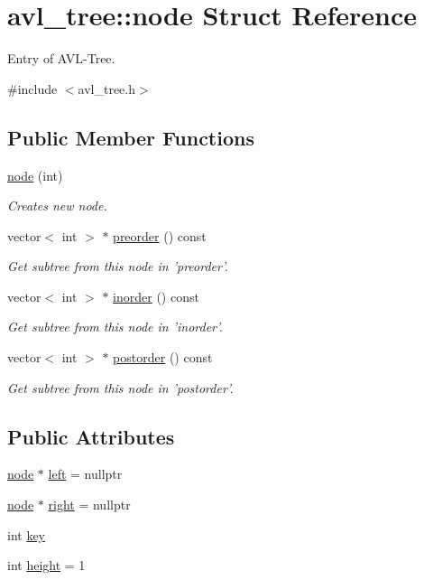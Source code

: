 \hypertarget{structavl__tree_1_1node}{\section{avl\-\_\-tree\-:\-:node Struct Reference}
\label{structavl__tree_1_1node}
}


Entry of A\-V\-L-\/\-Tree.  




{\ttfamily \#include $<$avl\-\_\-tree.\-h$>$}

\subsection*{Public Member Functions}
\begin{DoxyCompactItemize}
\item 
\hyperlink{structavl__tree_1_1node_a94e7fa472a575bbcae1e506c4c8b3534}{node} (int)
\begin{DoxyCompactList}\small\item\em Creates new node. \end{DoxyCompactList}\item 
vector$<$ int $>$ $\ast$ \hyperlink{structavl__tree_1_1node_a6932b4c28a69e1adc86f41f74e16cd6e}{preorder} () const 
\begin{DoxyCompactList}\small\item\em Get subtree from this node in 'preorder'. \end{DoxyCompactList}\item 
vector$<$ int $>$ $\ast$ \hyperlink{structavl__tree_1_1node_ac0a51c1a20c50c9c4e0d7037e28afbc2}{inorder} () const 
\begin{DoxyCompactList}\small\item\em Get subtree from this node in 'inorder'. \end{DoxyCompactList}\item 
vector$<$ int $>$ $\ast$ \hyperlink{structavl__tree_1_1node_abe9f3981d8b35f0816657345eeada0a2}{postorder} () const 
\begin{DoxyCompactList}\small\item\em Get subtree from this node in 'postorder'. \end{DoxyCompactList}\end{DoxyCompactItemize}
\subsection*{Public Attributes}
\begin{DoxyCompactItemize}
\item 
\hyperlink{structavl__tree_1_1node}{node} $\ast$ \hyperlink{structavl__tree_1_1node_a3e7851f7104dd71af924b27e70d80f3a}{left} = nullptr
\item 
\hyperlink{structavl__tree_1_1node}{node} $\ast$ \hyperlink{structavl__tree_1_1node_aff21ea47ae19da99113bd7900fb69785}{right} = nullptr
\item 
int \hyperlink{structavl__tree_1_1node_a07b67fe6e79e2272835dd6485272b823}{key}
\item 
int \hyperlink{structavl__tree_1_1node_a57a93259cb3f71b15fe737a559d8f0cc}{height} = 1
\end{DoxyCompactItemize}


